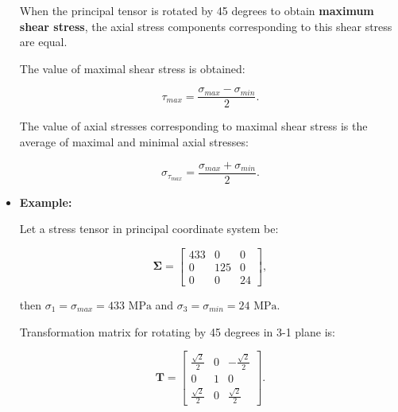 \begin{itemize}
        \begin{bbox}[0.85]
            When the principal tensor is rotated by 45 degrees to obtain \textbf{maximum
            shear stress}, the axial stress components corresponding to this shear
            stress are equal.

            The value of maximal shear stress is obtained:

            \begin{equation}
                \tau_{max} = \frac{\sigma_{max} - \sigma_{min}}{2}
            .\end{equation}

            The value of axial stresses corresponding to maximal shear stress is
            the average of maximal and minimal axial stresses:

            \begin{equation}
                \sigma_{\tau_{max}} = \frac{\sigma_{max} + \sigma_{min}}{2}
            .\end{equation}

        \end{bbox}

    \item \textbf{Example:}

        Let a stress tensor in principal coordinate system be:

        \begin{equation}
             \mathbf{\Sigma} = \begin{bmatrix}
                 433 & 0 & 0 \\
                 0 & 125 & 0 \\
                 0 & 0 & 24
             \end{bmatrix}
        ,\end{equation}

        then $\sigma_1 = \sigma_{max} = 433 \text{ MPa}$ and
        $\sigma_3 = \sigma_{min} = 24 \text{ MPa}$.

        Transformation matrix for rotating by 45 degrees in 3-1 plane is:

        \begin{equation}
            \mathbf{T} = \begin{bmatrix}
                \frac{\sqrt{2}}{2} & 0 & -\frac{\sqrt{2}}{2} \\
                0 & 1 & 0 \\
                \frac{\sqrt{2}}{2} & 0 & \frac{\sqrt{2}}{2}
            \end{bmatrix}
        .\end{equation}


\end{itemize}
